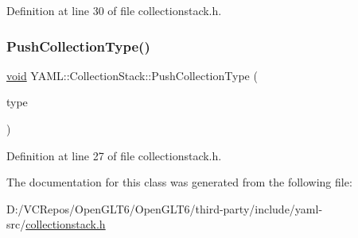 Definition at line 30 of file collectionstack.\+h.

\mbox{\label{class_y_a_m_l_1_1_collection_stack_ad8518872b449921cf13d30c66379eaa9}} 
\subsubsection{\texorpdfstring{PushCollectionType()}{PushCollectionType()}}
{\footnotesize\ttfamily \mbox{\hyperlink{glad_8h_a950fc91edb4504f62f1c577bf4727c29}{void}} Y\+A\+M\+L\+::\+Collection\+Stack\+::\+Push\+Collection\+Type (\begin{DoxyParamCaption}\item[{\mbox{\hyperlink{struct_y_a_m_l_1_1_collection_type_a58f952b2cc7ebfe8423b5f50ed759bad}{Collection\+Type\+::value}}}]{type }\end{DoxyParamCaption})\hspace{0.3cm}{\ttfamily [inline]}}



Definition at line 27 of file collectionstack.\+h.



The documentation for this class was generated from the following file\+:\begin{DoxyCompactItemize}
\item 
D\+:/\+V\+C\+Repos/\+Open\+G\+L\+T6/\+Open\+G\+L\+T6/third-\/party/include/yaml-\/src/\mbox{\hyperlink{collectionstack_8h}{collectionstack.\+h}}\end{DoxyCompactItemize}
